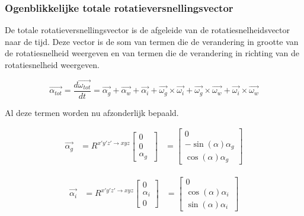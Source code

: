 \subsubsection{Ogenblikkelijke totale rotatieversnellingsvector}
De totale rotatieversnellingsvector is de afgeleide van de rotatiesnelheidsvector naar de tijd. Deze vector is de som van termen die de verandering in grootte van de rotatiesnelheid weergeven en van termen die de verandering in richting van de rotatiesnelheid weergeven.

\begin{equation}
\overrightarrow{\alpha_{tot}}=\frac{d\overrightarrow{\omega_{tot}}}{dt}=\overrightarrow{\alpha_{g}}+\overrightarrow{\alpha_{w}}+\overrightarrow{\alpha_{i}}+\overrightarrow{\omega_{g}}\times\overrightarrow{\omega_{i}}+\overrightarrow{\omega_{g}}\times\overrightarrow{\omega_{w}}+\overrightarrow{\omega_{i}}\times\overrightarrow{\omega_{w}}
\end{equation}

Al deze termen worden nu afzonderlijk bepaald.

\begin{equation*}
\begin{split}
\overrightarrow{\alpha_{g}}&=R^{x'y'z' \rightarrow xyz}
	\begin{bmatrix}
	0\\
	0\\
	\alpha_{g}\
	\end{bmatrix}
	&=\begin{bmatrix}
	0\\
	-\sin(\alpha)\alpha_{g}\\
	\cos(\alpha)\alpha_{g}\
	\end{bmatrix}
\end{split}
\end{equation*}

\begin{equation*}
\begin{split}
\overrightarrow{\alpha_{i}}&=R^{x'y'z' \rightarrow xyz}
	\begin{bmatrix}
	0\\
	\alpha_{i}\\
	0\
	\end{bmatrix}
	&=\begin{bmatrix}
	0\\
	\cos(\alpha)\alpha_{i}\\
	\sin(\alpha)\alpha_{i}\
	\end{bmatrix}
\end{split}
\end{equation*}


